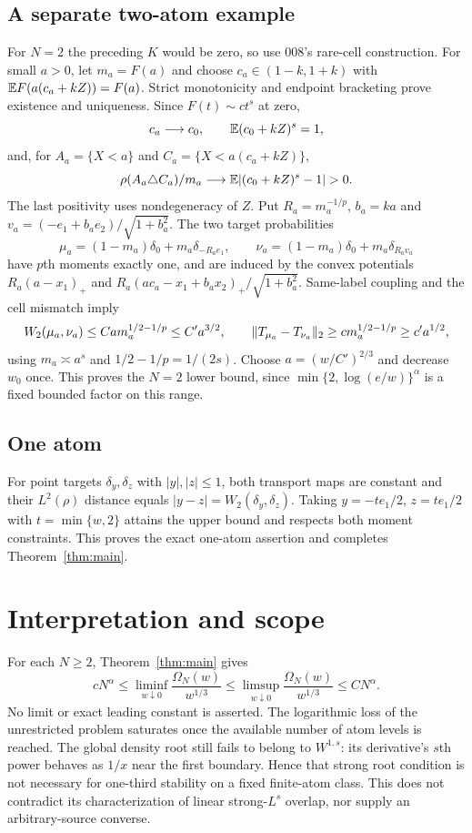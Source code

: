 \documentclass[11pt]{article}
\theoremstyle{remark}\newtheorem{remark}[theorem]{Remark}
\begin{document}
\subsection{A separate two-atom example}
For $N=2$ the preceding $K$ would be zero, so use 008's rare-cell construction. For small $a>0$, let $m_a=F(a)$ and choose $c_a\in(1-k,1+k)$ with
$\mathbb E F(a(c_a+kZ))=F(a)$. Strict monotonicity and endpoint bracketing prove existence and uniqueness. Since $F(t)\sim c t^s$ at zero,
\[
 c_a\longrightarrow c_0,\qquad \mathbb E(c_0+kZ)^s=1,
\]
and, for $A_a=\{X<a\}$ and $C_a=\{X<a(c_a+kZ)\}$,
\[
 \rho(A_a\triangle C_a)/m_a\longrightarrow
       \E|(c_0+kZ)^s-1|>0.
\]
The last positivity uses nondegeneracy of $Z$. Put $R_a=m_a^{-1/p}$,
$b_a=ka$ and $v_a=(-e_1+b_ae_2)/\sqrt{1+b_a^2}$. The two target probabilities
\[
 \mu_a=(1-m_a)\delta_0+m_a\delta_{-R_ae_1},\qquad
 \nu_a=(1-m_a)\delta_0+m_a\delta_{R_av_a}
\]
have $p$th moments exactly one, and are induced by the convex potentials
$R_a(a-x_1)_+$ and
$R_a(a c_a-x_1+b_ax_2)_+/\sqrt{1+b_a^2}$.
Same-label coupling and the cell mismatch imply
\[
 W_2(\mu_a,\nu_a)\le C a m_a^{1/2-1/p}\le C'a^{3/2},\qquad
 \lVert T_{\mu_a}-T_{\nu_a}\rVert_2\ge c m_a^{1/2-1/p}\ge c'a^{1/2},
\]
using $m_a\asymp a^s$ and $1/2-1/p=1/(2s)$. Choose
$a=(w/C')^{2/3}$ and decrease $w_0$ once. This proves the $N=2$ lower bound, since $\min\{2,\log(e/w)\}^{\alpha}$ is a fixed bounded factor on this range.

\subsection{One atom}
For point targets $\delta_y,\delta_z$ with $|y|,|z|\le1$, both transport maps are constant and their $L^2(\rho)$ distance equals $|y-z|=W_2(\delta_y,\delta_z)$. Taking
$y=-te_1/2$, $z=te_1/2$ with $t=\min\{w,2\}$ attains the upper bound and respects both moment constraints. This proves the exact one-atom assertion and completes Theorem~\ref{thm:main}.

\section{Interpretation and scope}
For each $N\ge2$, Theorem~\ref{thm:main} gives
\[
 cN^{\alpha}\le\liminf_{w\downarrow0}\frac{\Omega_N(w)}{w^{1/3}}
 \le\limsup_{w\downarrow0}\frac{\Omega_N(w)}{w^{1/3}}\le CN^{\alpha}.
\]
No limit or exact leading constant is asserted. The logarithmic loss of the unrestricted problem saturates once the available number of atom levels is reached. The global density root still fails to belong to $W^{1,s}$: its derivative's $s$th power behaves as $1/x$ near the first boundary. Hence that strong root condition is not necessary for one-third stability on a fixed finite-atom class. This does not contradict its characterization of linear strong-$L^s$ overlap, nor supply an arbitrary-source converse.
\end{document}
